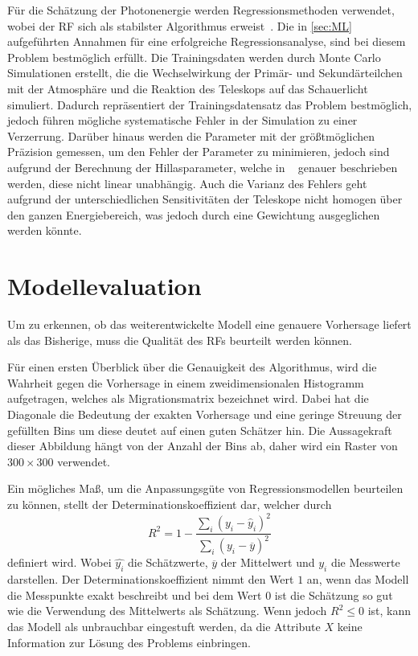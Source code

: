 Für die Schätzung der Photonenergie werden Regressionsmethoden verwendet, wobei der RF sich als stabilster Algorithmus erweist~\cite{Cherenkov_Licht}.
Die in \autoref{sec:ML} aufgeführten Annahmen für eine erfolgreiche Regressionsanalyse, sind bei diesem Problem bestmöglich erfüllt. Die Trainingsdaten
werden durch Monte Carlo Simulationen erstellt, die die Wechselwirkung der Primär- und Sekundärteilchen mit der Atmosphäre und die Reaktion des Teleskops
auf das Schauerlicht simuliert.
Dadurch repräsentiert der Trainingsdatensatz das Problem bestmöglich, jedoch führen mögliche systematische Fehler in der Simulation zu einer Verzerrung.
Darüber hinaus werden die Parameter mit der größtmöglichen Präzision gemessen, um den Fehler der Parameter zu minimieren,
jedoch sind aufgrund der Berechnung der Hillasparameter, welche in ~\cite[102]{HESS}
genauer beschrieben werden, diese nicht linear unabhängig.
Auch die Varianz des Fehlers geht aufgrund der unterschiedlichen Sensitivitäten der Teleskope nicht homogen
über den ganzen Energiebereich, was jedoch durch eine Gewichtung ausgeglichen werden könnte.

\section{Modellevaluation}
\label{sec:Per}

Um zu erkennen, ob das weiterentwickelte Modell eine genauere Vorhersage liefert als das Bisherige, muss die
Qualität des RFs beurteilt werden können.

Für einen ersten Überblick über die Genauigkeit des Algorithmus, wird die Wahrheit gegen die Vorhersage in einem
zweidimensionalen Histogramm aufgetragen, welches als Migrationsmatrix bezeichnet wird.
Dabei hat die Diagonale die Bedeutung der exakten Vorhersage und eine geringe Streuung der gefüllten Bins
um diese deutet auf einen guten Schätzer hin.
Die Aussagekraft dieser Abbildung hängt von der Anzahl der Bins ab, daher wird ein Raster von $300 \times 300$ verwendet.

Ein mögliches Maß, um die Anpassungsgüte von Regressionsmodellen beurteilen zu können, stellt der Determinationskoeffizient dar, welcher
durch
\begin{equation}
  R^2 = 1 - \frac{\sum_i (y_i-\hat{y}_i)^2}{\sum_i (y_i - \overline{y})^2}
\end{equation}
definiert wird. Wobei $\hat{y_i}$ die Schätzwerte, $\overline{y}$ der Mittelwert und $y_i$ die Messwerte darstellen.
Der Determinationskoeffizient nimmt den Wert $1$ an, wenn das Modell die Messpunkte exakt beschreibt und bei dem Wert $0$ ist
die Schätzung so gut wie die Verwendung des Mittelwerts als Schätzung. Wenn jedoch
$R^2 \leq 0$ ist, kann das Modell als unbrauchbar eingestuft werden, da die Attribute $X$ keine Information zur
Lösung des Problems einbringen.

